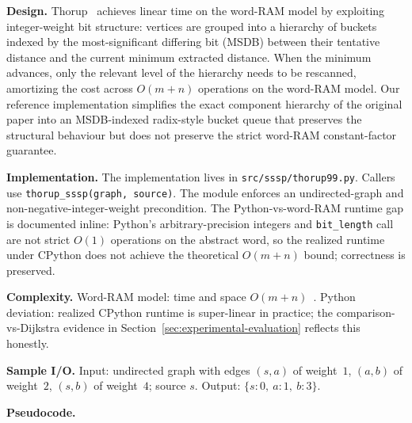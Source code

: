\documentclass[12pt]{article}
\begin{document}
\textbf{Design.} Thorup~\cite{thorup1999linear} achieves linear time on the word-RAM model by exploiting integer-weight bit structure: vertices are grouped into a hierarchy of buckets indexed by the most-significant differing bit (MSDB) between their tentative distance and the current minimum extracted distance. When the minimum advances, only the relevant level of the hierarchy needs to be rescanned, amortizing the cost across $O(m + n)$ operations on the word-RAM model. Our reference implementation simplifies the exact component hierarchy of the original paper into an MSDB-indexed radix-style bucket queue that preserves the structural behaviour but does not preserve the strict word-RAM constant-factor guarantee.
\medskip

{\raggedright\setlength{\parindent}{0.5in}
\indent\textbf{Implementation.} The implementation lives in \texttt{src/sssp/thorup99.py}. Callers use \texttt{thorup\_sssp(graph, source)}. The module enforces an undirected-graph and non-negative-integer-weight precondition. The Python-vs-word-RAM runtime gap is documented inline: Python's arbitrary-precision integers and \texttt{bit\_length} call are not strict $O(1)$ operations on the abstract word, so the realized runtime under CPython does not achieve the theoretical $O(m + n)$ bound; correctness is preserved.
\par}
\medskip

\textbf{Complexity.} Word-RAM model: time and space $O(m + n)$~\cite{thorup1999linear}. Python deviation: realized CPython runtime is super-linear in practice; the comparison-vs-Dijkstra evidence in Section~\ref{sec:experimental-evaluation} reflects this honestly.
\medskip

\textbf{Sample I/O.} Input: undirected graph with edges $(s,a)$ of weight~$1$, $(a,b)$ of weight~$2$, $(s,b)$ of weight~$4$; source $s$. Output: $\{s : 0,\ a : 1,\ b : 3\}$.

\newpage
\noindent\textbf{Pseudocode.}
\end{document}
